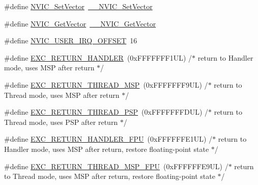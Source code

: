 \begin{DoxyCompactItemize}
\#define \hyperlink{group___c_m_s_i_s___core___n_v_i_c_functions_ga804af63bb4c4c317387897431814775d}{N\+V\+I\+C\+\_\+\+Set\+Vector}~\hyperlink{group___c_m_s_i_s___core___n_v_i_c_functions_ga0df355460bc1783d58f9d72ee4884208}{\+\_\+\+\_\+\+N\+V\+I\+C\+\_\+\+Set\+Vector}
\item 
\#define \hyperlink{group___c_m_s_i_s___core___n_v_i_c_functions_ga955eb1c33a3dcc62af11a8385e8c0fc8}{N\+V\+I\+C\+\_\+\+Get\+Vector}~\hyperlink{group___c_m_s_i_s___core___n_v_i_c_functions_ga44b665d2afb708121d9b10c76ff00ee5}{\+\_\+\+\_\+\+N\+V\+I\+C\+\_\+\+Get\+Vector}
\item 
\#define \hyperlink{group___c_m_s_i_s___core___n_v_i_c_functions_ga8045d905a5ca57437d8e6f71ffcb6df5}{N\+V\+I\+C\+\_\+\+U\+S\+E\+R\+\_\+\+I\+R\+Q\+\_\+\+O\+F\+F\+S\+ET}~16
\item 
\#define \hyperlink{group___c_m_s_i_s___core___n_v_i_c_functions_gaa6fa2b10f756385433e08522d9e4632f}{E\+X\+C\+\_\+\+R\+E\+T\+U\+R\+N\+\_\+\+H\+A\+N\+D\+L\+ER}~(0x\+F\+F\+F\+F\+F\+F\+F1\+U\+L)     /$\ast$ return to Handler mode, uses M\+S\+P after return                               $\ast$/
\item 
\#define \hyperlink{group___c_m_s_i_s___core___n_v_i_c_functions_gaea4703101b5e679f695e231f7ee72331}{E\+X\+C\+\_\+\+R\+E\+T\+U\+R\+N\+\_\+\+T\+H\+R\+E\+A\+D\+\_\+\+M\+SP}~(0x\+F\+F\+F\+F\+F\+F\+F9\+U\+L)     /$\ast$ return to Thread mode, uses M\+S\+P after return                                $\ast$/
\item 
\#define \hyperlink{group___c_m_s_i_s___core___n_v_i_c_functions_ga9998daf0fbdf31dbc8f81cd604b58175}{E\+X\+C\+\_\+\+R\+E\+T\+U\+R\+N\+\_\+\+T\+H\+R\+E\+A\+D\+\_\+\+P\+SP}~(0x\+F\+F\+F\+F\+F\+F\+F\+D\+U\+L)     /$\ast$ return to Thread mode, uses P\+S\+P after return                                $\ast$/
\item 
\#define \hyperlink{group___c_m_s_i_s___core___n_v_i_c_functions_ga3aa6648e1c3c09fbab1f543b9dcffc3a}{E\+X\+C\+\_\+\+R\+E\+T\+U\+R\+N\+\_\+\+H\+A\+N\+D\+L\+E\+R\+\_\+\+F\+PU}~(0x\+F\+F\+F\+F\+F\+F\+E1\+U\+L)     /$\ast$ return to Handler mode, uses M\+S\+P after return, restore floating-\/point state $\ast$/
\item 
\#define \hyperlink{group___c_m_s_i_s___core___n_v_i_c_functions_gaad4cb3b34fd4264ccfae1fbbc75a3431}{E\+X\+C\+\_\+\+R\+E\+T\+U\+R\+N\+\_\+\+T\+H\+R\+E\+A\+D\+\_\+\+M\+S\+P\+\_\+\+F\+PU}~(0x\+F\+F\+F\+F\+F\+F\+E9\+U\+L)     /$\ast$ return to Thread mode, uses M\+S\+P after return, restore floating-\/point state  $\ast$/
\item 

\end{DoxyCompactItemize}
